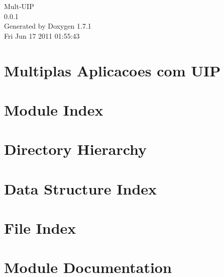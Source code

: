 \documentclass[a4paper]{book}
\begin{document}
\hypersetup{pageanchor=false}
\begin{titlepage}
\vspace*{7cm}
\begin{center}
{\Large Mult-\/UIP \\[1ex]\large 0.0.1 }\\
\vspace*{1cm}
{\large Generated by Doxygen 1.7.1}\\
\vspace*{0.5cm}
{\small Fri Jun 17 2011 01:55:43}\\
\end{center}
\end{titlepage}
\clearemptydoublepage
{}
\tableofcontents
\clearemptydoublepage
{}
\hypersetup{pageanchor=true}
\chapter{Multiplas Aplicacoes com UIP}
\label{index}\hypertarget{index}{}
\chapter{Module Index}

\chapter{Directory Hierarchy}

\chapter{Data Structure Index}

\chapter{File Index}

\chapter{Module Documentation}





























\end{document}
